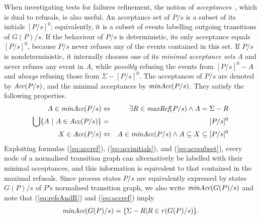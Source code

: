 When investigating  tests for failures refinement, the notion of
\emph{acceptances}~\cite{Hennessy:1988:ATP:50497}, which is dual to refusals,
is also useful. An acceptance set of $P/s$ is a subset of its initials
$[P/s]^0$; equivalently, it is a subset of events labelling  outgoing transitions of
$G(P)/s$. If the behaviour of  $P/s$ is deterministic, its only acceptance
equals $[P/s]^0$, because $P/s$ never refuses any of the events contained in
this set. If $P/s$ is nondeterministic, it internally chooses one of its
\emph{minimal acceptance sets} $A$ and never refuses any event in $A$, while
{\it possibly} refusing the events from $[P/s]^0 - A$ and 
{\it always} refusing those from $\Sigma - [P/s]^0$.  
The acceptances of $P/s$ are denoted by
$\text{\it Acc}(P/s)$, and the minimal acceptances by $\text{\it minAcc}(P/s)$. They satisfy
the following properties.
%
\begin{eqnarray}
A\in \text{\it minAcc}(P/s) & \Leftrightarrow & \exists R\in\text{\it maxRef}(P/s) \wedge A = \Sigma-R
\label{eq:accref}
\\
\bigcup \{ A~|~A\in \text{\it Acc}(P/s)\} & = & [P/s]^0
\label{eq:accinitials}
\\
 X\in\text{\it Acc}(P/s) &\Leftrightarrow & A\in \text{\it minAcc}(P/s) \wedge A\subseteq X \subseteq [P/s]^0
 \label{eq:accsubset}
\end{eqnarray}
%
%
Exploiting formulas (\ref{eq:accref}), (\ref{eq:accinitials}), and
(\ref{eq:accsubset}), every node of a normalised transition graph can
alternatively be labelled with their minimal acceptances, and this
information is equivalent to that contained in the maximal refusals. Since
process states $P/s$ are equivalently expressed by states $G(P)/s$ of $P$'s
normalised transition graph, we also write $\text{\it minAcc}(G(P)/s)$ and
note that (\ref{eq:refsAndR}) and (\ref{eq:accref}) imply 
\begin{equation}\label{eq:maxrefsminaccs}
\text{\it minAcc}(G(P)/s) = \{ \Sigma - R | R\in r(G(P)/s) \}.
\end{equation}

 

